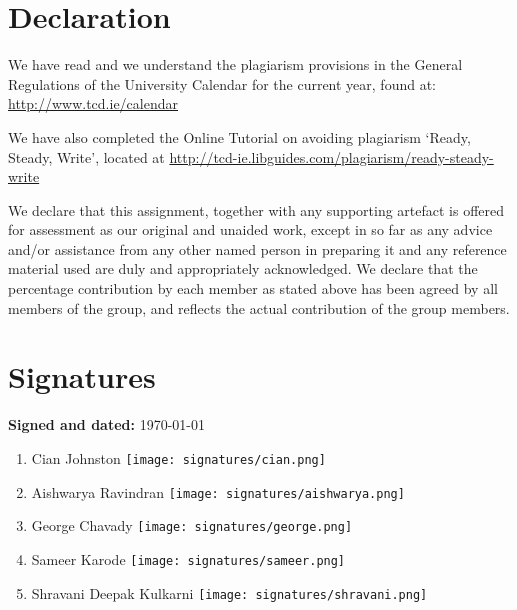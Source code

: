 \documentclass[a4paper,10pt]{article}
\begin{document}
\section{Declaration}
We have read and we understand the plagiarism provisions in the General Regulations of the University Calendar for the current year, found at: \url{http://www.tcd.ie/calendar}

We have also completed the Online Tutorial on avoiding plagiarism ‘Ready, Steady, Write’, located at \url{http://tcd-ie.libguides.com/plagiarism/ready-steady-write}

We  declare  that  this  assignment, together with any supporting artefact is offered for assessment as our original and unaided work, except in so far as any advice and/or assistance from any other named person in preparing it and any reference material used are duly and appropriately acknowledged. We declare that the percentage contribution by each member as stated above has been agreed by all members of the group, and reflects the actual contribution of the group members.

\section{Signatures}
\textbf{Signed and dated:} \today

\begin{enumerate}
    \item{
        Cian Johnston \texttt{[image: signatures/cian.png]}
    }
    \item{
        Aishwarya Ravindran \texttt{[image: signatures/aishwarya.png]}
    }
    \item{
        George Chavady \texttt{[image: signatures/george.png]}
    }
    \item{
        Sameer Karode \texttt{[image: signatures/sameer.png]}
    }
    \item{
        Shravani Deepak Kulkarni \texttt{[image: signatures/shravani.png]}
    }

\end{enumerate}
\end{document}
